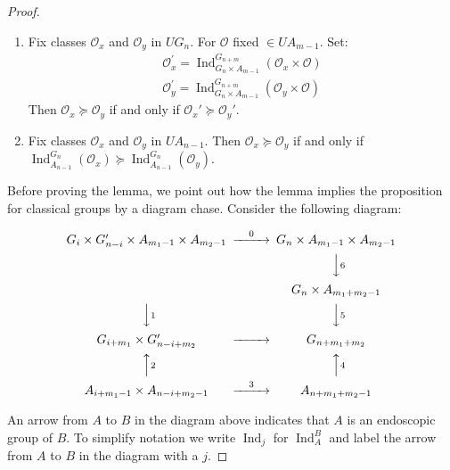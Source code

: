 \documentclass{amsart}
\newenvironment{cthm}[1]
  {\renewcommand\thethm{\sc #1}\thm}
  {\endthm}
\newcommand\Am		{A_{m-1}}
\newcommand\Amone[1]{A_{m_{#1}-1}}
\newcommand\Ind	{\operatorname{Ind}}
\newcommand\cO		{{\mathcal O}}
\begin{document}
\begin{proof}
\begin{cthm}{Lemma}
     \begin{enumerate}[label=(\alph*)]
     \item Fix classes $\cO_x$ and $\cO_y$ in $UG_n$.  For
$\cO$ fixed 
          $\in U\Am$.  Set:
               \begin{gather*}
               \cO_x^\prime = \Ind_{G_n \times \Am}^{G_{n+m}}
(\cO_x \times \cO) \\
               \cO_y^\prime = \Ind_{G_n \times \Am}^{G_{n+m}}
(\cO_y \times \cO)
               \end{gather*}
          Then $\cO_x \succeq \cO_y$ if and only if $\cO_x' \succeq
\cO_y'$.
     \item Fix classes $\cO_x$ and $\cO_y$ in $UA_{n-1}$. 
Then
          $\cO_x \succeq \cO_y$ if and only if
          $\Ind_{A_{n-1}}^{G_n} (\cO_x) \succeq
\Ind_{A_{n-1}}^{G_n} (\cO_y)$.
     \end{enumerate}
     \end{cthm}

Before proving the lemma, we point out how the lemma implies the
proposition
for classical groups by a diagram chase.  Consider the following
diagram:

\bigskip
     $$
     \begin{CD}
     G_i \times G^\prime_{n-i} \times \Amone{1} \times \Amone{2} 
@>0>>
          G_n \times \Amone{1} \times \Amone{2} \\
     @.   @VV6V \\
     @.   G_n \times A_{m_1 + m_2-1} \\
     @VV1V  @VV5V \\
     G_{i+m_1} \times G^\prime_{n-i+m_2}  @>>>  G_{n+m_1+m_2} \\
     @AA2A     @AA4A \\
     A_{i+m_1-1} \times A_{n-i+m_2-1}   @>3>>     A_{n+m_1+m_2-1}
     \end{CD}
     $$
\bigskip

An arrow from $A$ to $B$ in the diagram above indicates that $A$
is an
endoscopic group of $B$.  To simplify notation we write $\Ind_j$
for
$\Ind_A^B$ and label the arrow from $A$ to $B$ in the diagram
with a $j$.


\end{proof}
\end{document}
